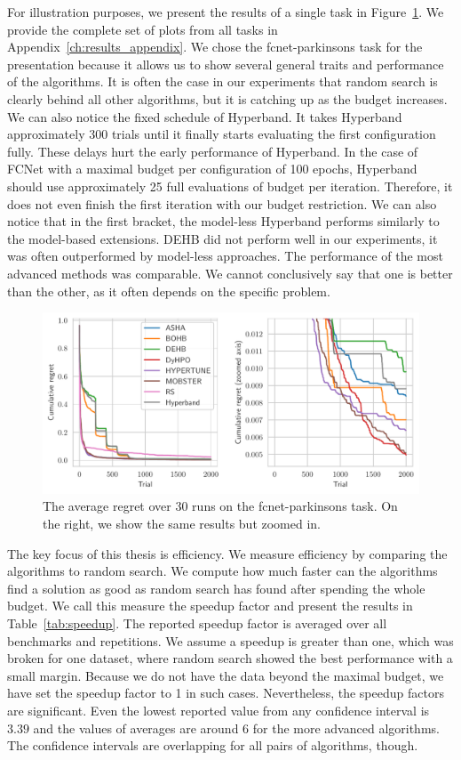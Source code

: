 For illustration purposes, we present the results of a single task in Figure~\ref{fig:parkinsons}. We provide the complete set of plots from all tasks in Appendix~\ref{ch:results_appendix}. We chose the fcnet-parkinsons task for the presentation because it allows us to show several general traits and performance of the algorithms. It is often the case in our experiments that random search is clearly behind all other algorithms, but it is catching up as the budget increases. We can also notice the fixed schedule of Hyperband. It takes Hyperband approximately 300 trials until it finally starts evaluating the first configuration fully. These delays hurt the early performance of Hyperband. In the case of FCNet with a maximal budget per configuration of 100 epochs, Hyperband should use approximately 25 full evaluations of budget per iteration. Therefore, it does not even finish the first iteration with our budget restriction. We can also notice that in the first bracket, the model-less Hyperband performs similarly to the model-based extensions. DEHB did not perform well in our experiments, it was often outperformed by model-less approaches. The performance of the most advanced methods was comparable. We cannot conclusively say that one is better than the other, as it often depends on the specific problem.

\begin{figure}
    \centering
    \includegraphics[scale=.75]{img/tabular_exp/fcnet-parkinsons_plot.pdf}
    \caption{The average regret over 30 runs on the fcnet-parkinsons task. On the right, we show the same results but zoomed in.}
    \label{fig:parkinsons}
\end{figure}

The key focus of this thesis is efficiency. We measure efficiency by comparing the algorithms to random search. We compute how much faster can the algorithms find a solution as good as random search has found after spending the whole budget. We call this measure the speedup factor and present the results in Table~\ref{tab:speedup}. The reported speedup factor is averaged over all benchmarks and repetitions. We assume a speedup is greater than one, which was broken for one dataset, where random search showed the best performance with a small margin. Because we do not have the data beyond the maximal budget, we have set the speedup factor to 1 in such cases. Nevertheless, the speedup factors are significant. Even the lowest reported value from any confidence interval is $3.39$ and the values of averages are around $6$ for the more advanced algorithms. The confidence intervals are overlapping for all pairs of algorithms, though.

